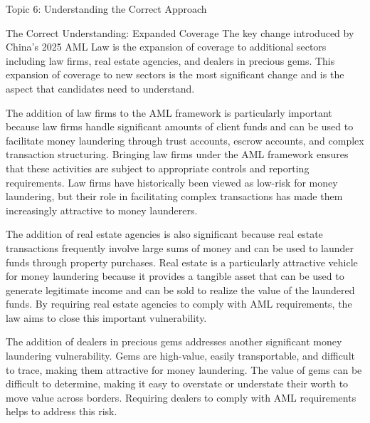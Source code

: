\documentclass[5pt]{beamer}
\begin{document}
	\begin{frame}{Topic 6: Understanding the Correct Approach}
		\begin{block}{\tiny The Correct Understanding: Expanded Coverage}
			\tiny The key change introduced by China's 2025 AML Law is the expansion of coverage to additional sectors including law firms, real estate agencies, and dealers in precious gems. This expansion of coverage to new sectors is the most significant change and is the aspect that candidates need to understand.
			
			The addition of law firms to the AML framework is particularly important because law firms handle significant amounts of client funds and can be used to facilitate money laundering through trust accounts, escrow accounts, and complex transaction structuring. Bringing law firms under the AML framework ensures that these activities are subject to appropriate controls and reporting requirements. Law firms have historically been viewed as low-risk for money laundering, but their role in facilitating complex transactions has made them increasingly attractive to money launderers.
			
			The addition of real estate agencies is also significant because real estate transactions frequently involve large sums of money and can be used to launder funds through property purchases. Real estate is a particularly attractive vehicle for money laundering because it provides a tangible asset that can be used to generate legitimate income and can be sold to realize the value of the laundered funds. By requiring real estate agencies to comply with AML requirements, the law aims to close this important vulnerability.
			
			The addition of dealers in precious gems addresses another significant money laundering vulnerability. Gems are high-value, easily transportable, and difficult to trace, making them attractive for money laundering. The value of gems can be difficult to determine, making it easy to overstate or understate their worth to move value across borders. Requiring dealers to comply with AML requirements helps to address this risk.
		\end{block}
	\end{frame}
	
\end{document}
